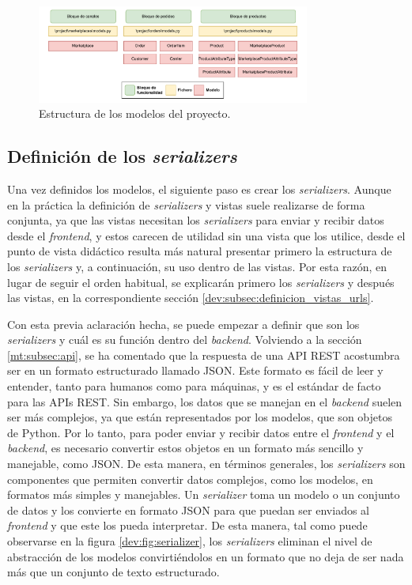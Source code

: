 \begin{figure}
    \centering
    \includegraphics[width=0.8\textwidth]{figures/design_develop/estructura_modelos.pdf}
    \caption{Estructura de los modelos del proyecto.}
    \label{dev:fig:estructura_modelos}
\end{figure}

\subsection{Definición de los \textit{serializers}}
\label{dev:subsec:definicion_serializers}

Una vez definidos los modelos, el siguiente paso es crear los \textit{serializers}. Aunque en la práctica la definición de \textit{serializers} y vistas suele realizarse de forma conjunta, ya que las vistas necesitan los \textit{serializers} para enviar y recibir datos desde el \textit{frontend}, y estos carecen de utilidad sin una vista que los utilice, desde el punto de vista didáctico resulta más natural presentar primero la estructura de los \textit{serializers} y, a continuación, su uso dentro de las vistas. Por esta razón, en lugar de seguir el orden habitual, se explicarán primero los \textit{serializers} y después las vistas, en la correspondiente sección \ref{dev:subsec:definicion_vistas_urls}.

Con esta previa aclaración hecha, se puede empezar a definir que son los \textit{serializers} y cuál es su función dentro del \textit{backend}. Volviendo a la sección \ref{mt:subsec:api}, se ha comentado que la respuesta de una API REST acostumbra ser en un formato estructurado llamado JSON. Este formato es fácil de leer y entender, tanto para humanos como para máquinas, y es el estándar de facto para las APIs REST. Sin embargo, los datos que se manejan en el \textit{backend} suelen ser más complejos, ya que están representados por los modelos, que son objetos de Python. Por lo tanto, para poder enviar y recibir datos entre el \textit{frontend} y el \textit{backend}, es necesario convertir estos objetos en un formato más sencillo y manejable, como JSON. De esta manera, en términos generales, los \textit{serializers} son componentes que permiten convertir datos complejos, como los modelos, en formatos más simples y manejables. Un \textit{serializer} toma un modelo o un conjunto de datos y los convierte en formato JSON para que puedan ser enviados al \textit{frontend} y que este los pueda interpretar. De esta manera, tal como puede observarse en la figura \ref{dev:fig:serializer}, los \textit{serializers} eliminan el nivel de abstracción de los modelos convirtiéndolos en un formato que no deja de ser nada más que un conjunto de texto estructurado.

